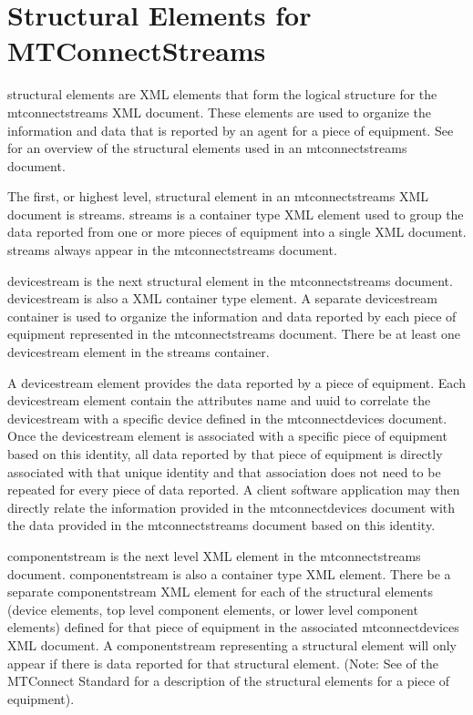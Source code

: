 \section{Structural Elements for MTConnectStreams}
\label{sec:Structural Elements for MTConnectStreams}
\lstset{numbers=left,xleftmargin=2em}

\glspl{structural element} are XML elements that form the logical structure for the \gls{mtconnectstreams} XML document.  These elements are used to organize the information and data that is reported by an \gls{agent} for a piece of equipment.  See  for an overview of the \glspl{structural element} used in an \gls{mtconnectstreams} document.

The first, or highest level, \gls{structural element} in an \gls{mtconnectstreams} XML document is \gls{streams}. \gls{streams} is a container type XML element used to group the data reported from one or more pieces of equipment into a single XML document.  \gls{streams} \must always appear in the \gls{mtconnectstreams} document.

\gls{devicestream} is the next \gls{structural element} in the \gls{mtconnectstreams} document. \gls{devicestream} is also a XML container type element.   A separate \gls{devicestream} container is used to organize the information and data reported by each piece of equipment represented in the \gls{mtconnectstreams} document.  There \must be at least one \gls{devicestream} element in the \gls{streams} container.  

A \gls{devicestream} element provides the data reported by a piece of equipment.  Each \gls{devicestream} element \must contain the attributes \gls{name} and \gls{uuid} to correlate the \gls{devicestream} with a specific \gls{device} defined in the \gls{mtconnectdevices} document.  Once the \gls{devicestream} element is associated with a specific piece of equipment based on this identity, all data reported by that piece of equipment is directly associated with that unique identity and that association does not need to be repeated for every piece of data reported.  A client software application may then directly relate the information provided in the \gls{mtconnectdevices} document with the data provided in the \gls{mtconnectstreams} document based on this identity.

\gls{componentstream} is the next level XML element in the \gls{mtconnectstreams} document.  \gls{componentstream} is also a container type XML element.   There \must be a separate \gls{componentstream} XML element for each of the \glspl{structural element} (\gls{device} elements, \gls{top level} \gls{component} elements, or \gls{lower level} \gls{component} elements) defined for that piece of equipment in the associated \gls{mtconnectdevices} XML document.  A \gls{componentstream} representing a \gls{structural element} will only appear if there is data reported for that \gls{structural element}.  (Note:  See  of the MTConnect Standard for a description of the \glspl{structural element} for a piece of equipment).   

